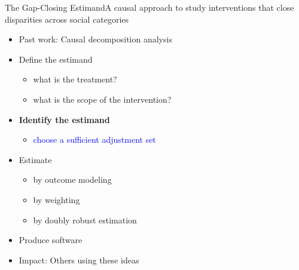 \documentclass{beamer}
\newcommand\bblue[1]{{\color{blue}\textbf{#1}}}
\begin{document}
{\begin{frame}{The Gap-Closing Estimand}{A causal approach to study interventions that close disparities across social categories}
	\begin{itemize}
		\item Past work: Causal decomposition analysis
		\item Define the estimand
		\begin{itemize}
			\item what is the treatment?
			\item what is the scope of the intervention?
		\end{itemize}
		\item \bblue{Identify the estimand}
		\begin{itemize}
			\item \textcolor{blue}{choose a sufficient adjustment set}
		\end{itemize}
		\item Estimate
		\begin{itemize}
			\item by outcome modeling
			\item by weighting
			\item by doubly robust estimation
		\end{itemize}
		\item Produce software
		\item Impact: Others using these ideas
	\end{itemize}
\end{frame}

}
\end{document}
